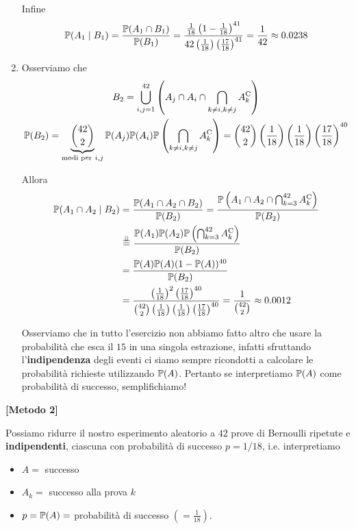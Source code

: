 \begin{enumerate}
Infine\begin{equation*}
\mathbb{P}( A_{1} \mid B_{1}) =\frac{\mathbb{P}( A_{1} \cap B_{1})}{\mathbb{P}( B_{1})} =\frac{\frac{1}{18}\left( 1-\frac{1}{18}\right)^{41}}{42\left(\frac{1}{18}\right)\left(\frac{17}{18}\right)^{41}} =\frac{1}{42} \approx 0.0238
\end{equation*}
\item Osserviamo che\begin{gather*}
B_{2} =\bigcup _{i,j=1}^{42}\left( A_{j} \cap A_{i} \cap \bigcap _{k\neq i,k\neq j} A_{k}^{\mathrm{C}}\right)\\
\mathbb{P}( B_{2}) =\underbrace{\binom{42}{2}}_{\text{modi per} \ i,j}\mathbb{P}( A_{j})\mathbb{P}( A_{i})\mathbb{P}\left(\bigcap _{k\neq i,k\neq j} A_{k}^{\mathrm{C}}\right) =\binom{42}{2}\left(\frac{1}{18}\right)\left(\frac{1}{18}\right)\left(\frac{17}{18}\right)^{40}
\end{gather*}

Allora\begin{equation*}
\begin{aligned}
\mathbb{P}( A_{1} \cap A_{2} \mid B_{2}) & =\frac{\mathbb{P}( A_{1} \cap A_{2} \cap B_{2})}{\mathbb{P}( B_{2})} =\frac{\mathbb{P}\left( A_{1} \cap A_{2} \cap \bigcap _{k=3}^{42} A_{k}^{\mathrm{C}}\right)}{\mathbb{P}( B_{2})}\\
 & \overset{\perp \!\!\! \perp }{=}\frac{\mathbb{P}( A_{1})\mathbb{P}( A_{2})\mathbb{P}\left(\bigcap _{k=3}^{42} A_{k}^{\mathrm{C}}\right)}{\mathbb{P}( B_{2})}\\
 & =\frac{\mathbb{P}( A)\mathbb{P}( A)( 1-\mathbb{P}( A))^{40}}{\mathbb{P}( B_{2})}\\
 & =\frac{\left(\frac{1}{18}\right)^{2}\left(\frac{17}{18}\right)^{40}}{\binom{42}{2}\left(\frac{1}{18}\right)\left(\frac{1}{18}\right)\left(\frac{17}{18}\right)^{40}} =\frac{1}{\binom{42}{2}} \approx 0.0012
\end{aligned}
\end{equation*}

\begin{oss}
Osserviamo che in tutto l'esercizio non abbiamo fatto altro che usare la probabilità che esca il $15$ in una singola estrazione, infatti sfruttando l'\textbf{indipendenza} degli eventi ci siamo sempre ricondotti a calcolare le probabilità richieste utilizzando $\mathbb{P}( A)$. Pertanto se interpretiamo $\mathbb{P}( A)$ come probabilità di successo, semplifichiamo!
\end{oss}
\end{enumerate}
\textbf{[Metodo 2]}

Possiamo ridurre il nostro esperimento aleatorio a $42$ prove di Bernoulli ripetute e \textbf{indipendenti}, ciascuna con probabilità di successo $p=1/18$, i.e. interpretiamo
\begin{itemize}
\item $A=$ successo
\item $A_{k} =$ successo alla prova $k$
\item $p=\mathbb{P}( A) =$ probabilità di successo $\left( =\frac{1}{18}\right)$.
\end{itemize}

